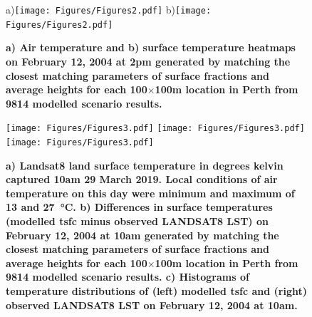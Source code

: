 \documentclass[final,3p,times,authoryear]{elsarticle}
\begin{document}
\begin{figure}
\centering
a)\texttt{[image: Figures/Figures2.pdf]}
b)\texttt{[image: Figures/Figures2.pdf]}
\caption{\bf a) Air temperature and b) surface temperature heatmaps on February 12, 2004 at 2pm generated by matching the closest matching parameters of surface fractions and average heights for each 100$\times$100m location in Perth from 9814 modelled scenario results.  }
 \label{fig:TaPerth}\label{fig:TsfcPerth}
\end{figure}


















\begin{figure}  
\centering
\texttt{[image: Figures/Figures3.pdf]}
\texttt{[image: Figures/Figures3.pdf]}
\texttt{[image: Figures/Figures3.pdf]}
\caption{\bf a) Landsat8 land surface temperature in degrees kelvin captured 10am 29 March 2019. Local conditions of air temperature on this day were minimum and maximum of 13 and 27\SI{}{\degreeCelsius}. b) Differences in surface temperatures (modelled \gls{tsfc} minus observed LANDSAT8 LST) on February 12, 2004 at 10am generated by matching the closest matching parameters of surface fractions and average heights for each 100$\times$100m location in Perth from 9814 modelled scenario results. c) Histograms of temperature distributions of (left) modelled \gls{tsfc} and (right) observed LANDSAT8 LST on February 12, 2004 at 10am. }
 \label{fig:Perth-Landsat-LST-29-03-2019}
 \label{fig:Perth-Landsat-TSFC-LST-29-03-2019}
 \label{fig:Perth_TSFC12_85}
\end{figure}
\end{document}
